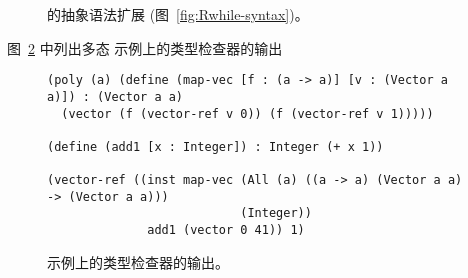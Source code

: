 \documentclass[11pt]{book}
\newcommand{\gray}[1]{{\color{gray} #1}}
\begin{document}
\begin{figure}[tp]
\centering
\fbox{
  \begin{minipage}{0.96\textwidth}
\small
\[
\begin{array}{lcl}
  \Type &::=& \ldots \mid \LP\key{All}~\LP\Var\ldots\RP~ \Type\RP \mid \Var \\
  \Exp &::=& \ldots \mid \INST{\Exp}{\Type}{\LP\Type\ldots\RP} \\
  \Def &::=& \gray{ \DEF{\Var}{\LP\LS\Var \key{:} \Type\RS \ldots\RP}{\Type}{\code{'()}}{\Exp} } \\
   &\mid& \LP\key{Poly}~\LP\Var\ldots\RP~ \DEF{\Var}{\LP\LS\Var \key{:} \Type\RS \ldots\RP}{\Type}{\code{'()}}{\Exp}\RP  \\
  \LangInst{} &::=& \gray{ \PROGRAMDEFSEXP{\code{'()}}{\LP\Def\ldots\RP}{\Exp} }
\end{array}
\]
\end{minipage}
}
\caption{ \LangInst{} 的抽象语法扩展 \LangLoop{} (图~\ref{fig:Rwhile-syntax})。}
\label{fig:Rpoly-prime-syntax}
\end{figure}

图~\ref{fig:map-vec-type-check} 中列出多态  示例上的类型检查器的输出

\begin{figure}[tbp]
\begin{lstlisting}
(poly (a) (define (map-vec [f : (a -> a)] [v : (Vector a a)]) : (Vector a a)
  (vector (f (vector-ref v 0)) (f (vector-ref v 1)))))

(define (add1 [x : Integer]) : Integer (+ x 1))

(vector-ref ((inst map-vec (All (a) ((a -> a) (Vector a a) -> (Vector a a)))
                           (Integer))
              add1 (vector 0 41)) 1)
\end{lstlisting}
\caption{  示例上的类型检查器的输出。}
\label{fig:map-vec-type-check}
\end{figure}
\end{document}
